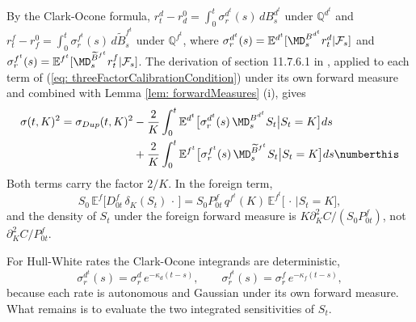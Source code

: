 By the Clark-Ocone formula, $r^d_t-r^0_d=\int_0^t\sigma^{d^t}_r(s)\,dB^{d^t}_s$ under $\mathbb{Q}^{d^t}$ and $r^f_t-r^0_f=\int_0^t\sigma^{f^t}_r(s)\,d\widetilde{B}^{f^t}_s$ under $\mathbb{Q}^{f^t}$, where $\sigma^{d^t}_r(s)=\mathbb{E}^{d^t}[\MD^{B^{d^t}}_sr^d_t|\mathcal{F}_s]$ and $\sigma^{f^t}_r(s)=\mathbb{E}^{f^t}[\MD^{\widetilde{B}^{f^t}}_sr^f_t|\mathcal{F}_s]$. The derivation of section 11.7.6.1 in \cite{guyonLabordere}, applied to each term of (\ref{eq: threeFactorCalibrationCondition}) under its own forward measure and combined with Lemma \ref{lem: forwardMeasures} (i), gives
\begin{align*}
\sigma(t,K)^2 = \sigma_{Dup}(t,K)^2 & - \frac{2}{K}\int _0^t \mathbb{E}^{d^t}\big[\sigma_r^{d^t}(s)\, \MD _s^{B^{d^t}}S_t  \big|S_t = K \big]ds \\
& +  \frac{2}{K}\int _0^t \mathbb{E}^{f^t}\big[\sigma_r^{f^t}(s)\, \MD _s^{\widetilde{B}^{f^t}}S_t  \big|S_t = K \big]ds
\numberthis \label{eq: threeFactorGeneralMalliavin}
\end{align*}
Both terms carry the factor $2/K$. In the foreign term,
$$S_0\,\mathbb{E}^f\big[D^f_{0t}\,\delta_K(S_t)\,\cdot\,\big]=S_0P^f_{0t}\,q^{f^t}(K)\,\mathbb{E}^{f^t}\big[\,\cdot\,\big|S_t=K\big],$$
and the density of $S_t$ under the foreign forward measure is $K\partial_K^2C/(S_0P^f_{0t})$, not $\partial^2_KC/P^f_{0t}$.

For Hull-White rates the Clark-Ocone integrands are deterministic,
\begin{equation}\label{eq: kernels}
\sigma_r^{d^t}(s)=\sigma^d_r\,e^{-\kappa_d(t-s)},\qquad \sigma_r^{f^t}(s)=\sigma^f_r\,e^{-\kappa_f(t-s)},
\end{equation}
because each rate is autonomous and Gaussian under its own forward measure. What remains is to evaluate the two integrated sensitivities of $S_t$.

